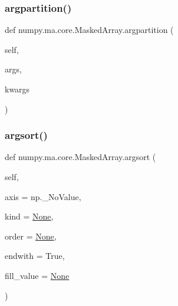 \subsubsection{\texorpdfstring{argpartition()}{argpartition()}}
{\footnotesize\ttfamily def numpy.\+ma.\+core.\+Masked\+Array.\+argpartition (\begin{DoxyParamCaption}\item[{}]{self,  }\item[{}]{args,  }\item[{}]{kwargs }\end{DoxyParamCaption})}

\mbox{\label{classnumpy_1_1ma_1_1core_1_1MaskedArray_ae3fa2e447d393fdd5e694977b098257f}} 
\subsubsection{\texorpdfstring{argsort()}{argsort()}}
{\footnotesize\ttfamily def numpy.\+ma.\+core.\+Masked\+Array.\+argsort (\begin{DoxyParamCaption}\item[{}]{self,  }\item[{}]{axis = {\ttfamily np.\+\_\+NoValue},  }\item[{}]{kind = {\ttfamily \hyperlink{namespacenumpy_1_1ma_1_1core_a647ee1848dfa3692fe35a663a2aa40b3}{None}},  }\item[{}]{order = {\ttfamily \hyperlink{namespacenumpy_1_1ma_1_1core_a647ee1848dfa3692fe35a663a2aa40b3}{None}},  }\item[{}]{endwith = {\ttfamily True},  }\item[{}]{fill\+\_\+value = {\ttfamily \hyperlink{namespacenumpy_1_1ma_1_1core_a647ee1848dfa3692fe35a663a2aa40b3}{None}} }\end{DoxyParamCaption})}

